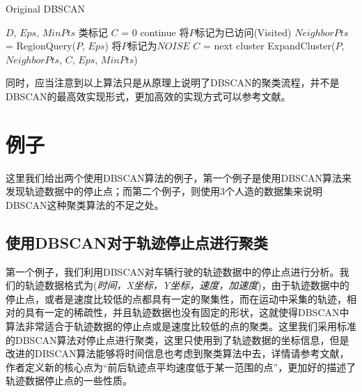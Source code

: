 \documentclass[UTF8, 12pt]{ctexart}
\begin{document}
\begin{algorithm}[H]
	\caption{Original DBSCAN}
	\label{alg3}
	\begin{algorithmic}[1]
		\REQUIRE $D$, $Eps$, $MinPts$
		\ENSURE 类标记
		\STATE $C$ = 0
				\STATE continue
			\ENDIF
			\STATE 将$P$标记为已访问(Visited)
			\STATE $NeighborPts$ = RegionQuery($P$, $Eps$)
				\STATE 将$P$标记为$NOISE$
			\ELSE
				\STATE $C$ = next cluster
				\STATE ExpandCluster($P$, $NeighborPts$, $C$, $Eps$, $MinPts$)
			\ENDIF
		\ENDFOR
	\end{algorithmic}
\end{algorithm}

同时，应当注意到以上算法只是从原理上说明了DBSCAN的聚类流程，并不是DBSCAN的最高效实现形式，更加高效的实现方式可以参考文献\cite{kumar2016fast}。

\section{例子}
这里我们给出两个使用DBSCAN算法的例子，第一个例子是使用DBSCAN算法来发现轨迹数据中的停止点；而第二个例子，则使用3个人造的数据集来说明DBSCAN这种聚类算法的不足之处。

\subsection{使用DBSCAN对于轨迹停止点进行聚类}
第一个例子，我们利用DBSCAN对车辆行驶的轨迹数据中的停止点进行分析。我们的轨迹数据格式为(\emph{时间，X坐标，Y坐标，速度，加速度})，由于轨迹数据中的停止点，或者是速度比较低的点都具有一定的聚集性，而在运动中采集的轨迹，相对的具有一定的稀疏性，并且轨迹数据也没有固定的形状，这就使得DBSCAN中算法非常适合于轨迹数据的停止点或是速度比较低的点的聚类。这里我们采用标准的DBSCAN算法对停止点进行聚类，这里只使用到了轨迹数据的坐标信息，但是改进的DBSCAN算法能够将时间信息也考虑到聚类算法中去，详情请参考文献\cite{palma2008clustering}，作者定义新的核心点为“前后轨迹点平均速度低于某一范围的点”，更加好的描述了轨迹数据停止点的一些性质。
\end{document}
